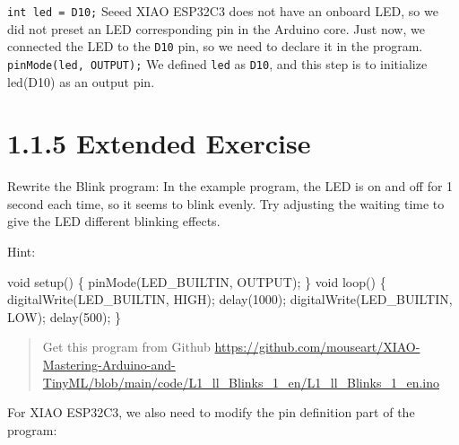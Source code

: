\documentclass[
  letterpaper,
  DIV=11,
  numbers=noendperiod]{scrreprt}
\newenvironment{Shaded}{\begin{snugshade}}{\end{snugshade}}
\newcommand{\DataTypeTok}[1]{\textcolor[rgb]{0.68,0.00,0.00}{#1}}
\newcommand{\DecValTok}[1]{\textcolor[rgb]{0.68,0.00,0.00}{#1}}
\newcommand{\NormalTok}[1]{\textcolor[rgb]{0.00,0.23,0.31}{#1}}
\newcommand{\OperatorTok}[1]{\textcolor[rgb]{0.37,0.37,0.37}{#1}}
\begin{document}
\texttt{int\ led\ =\ D10;} Seeed XIAO ESP32C3 does not have an onboard
LED, so we did not preset an LED corresponding pin in the Arduino core.
Just now, we connected the LED to the \texttt{D10} pin, so we need to
declare it in the program. \texttt{pinMode(led,\ OUTPUT);} We defined
\texttt{led} as \texttt{D10}, and this step is to initialize led(D10) as
an output pin.

\hypertarget{extended-exercise}{%
\section*{1.1.5 Extended Exercise}\label{extended-exercise}}


Rewrite the Blink program: In the example program, the LED is on and off
for 1 second each time, so it seems to blink evenly. Try adjusting the
waiting time to give the LED different blinking effects.

Hint:

\begin{Shaded}
\begin{Highlighting}[]
\DataTypeTok{void}\NormalTok{ setup}\OperatorTok{()} \OperatorTok{\{}
\NormalTok{    pinMode}\OperatorTok{(}\NormalTok{LED\_BUILTIN}\OperatorTok{,}\NormalTok{ OUTPUT}\OperatorTok{);}
\OperatorTok{\}}
\DataTypeTok{void}\NormalTok{ loop}\OperatorTok{()} \OperatorTok{\{}
\NormalTok{    digitalWrite}\OperatorTok{(}\NormalTok{LED\_BUILTIN}\OperatorTok{,}\NormalTok{ HIGH}\OperatorTok{);}   
\NormalTok{    delay}\OperatorTok{(}\DecValTok{1000}\OperatorTok{);}                     
\NormalTok{    digitalWrite}\OperatorTok{(}\NormalTok{LED\_BUILTIN}\OperatorTok{,}\NormalTok{ LOW}\OperatorTok{);}   
\NormalTok{    delay}\OperatorTok{(}\DecValTok{500}\OperatorTok{);}   
\OperatorTok{\}}
\end{Highlighting}
\end{Shaded}

\begin{quote}
Get this program from Github
\url{https://github.com/mouseart/XIAO-Mastering-Arduino-and-TinyML/blob/main/code/L1_ll_Blinks_1_en/L1_ll_Blinks_1_en.ino}
\end{quote}

For XIAO ESP32C3, we also need to modify the pin definition part of the
program:
\end{document}
